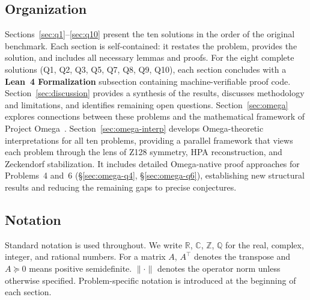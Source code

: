 \documentclass[11pt]{article}
\theoremstyle{definition}
\theoremstyle{remark}
\begin{document}
\subsection{Organization}

Sections~\ref{sec:q1}--\ref{sec:q10} present the ten solutions in the
order of the original benchmark.  Each section is self-contained:
it restates the problem, provides the solution, and includes all necessary
lemmas and proofs.  For the eight complete solutions
(Q1, Q2, Q3, Q5, Q7, Q8, Q9, Q10), each section concludes with a
\textbf{Lean~4 Formalization} subsection containing machine-verifiable
proof code.
Section~\ref{sec:discussion} provides a synthesis of the results, discusses
methodology and limitations, and identifies remaining open questions.
Section~\ref{sec:omega} explores connections between these problems and
the mathematical framework of Project Omega~\cite{omega-theory,omega-fop}.
Section~\ref{sec:omega-interp} develops Omega-theoretic interpretations
for all ten problems, providing a parallel framework that views each problem
through the lens of Z128 symmetry, HPA reconstruction, and Zeckendorf
stabilization.  It includes detailed Omega-native proof approaches for
Problems~4 and~6 (\S\ref{sec:omega-q4}, \S\ref{sec:omega-q6}),
establishing new structural results and reducing the remaining gaps
to precise conjectures.

\subsection{Notation}

Standard notation is used throughout.
We write $\mathbb R$, $\mathbb C$, $\mathbb Z$, $\mathbb Q$ for the
real, complex, integer, and rational numbers.
For a matrix $A$, $A^\top$ denotes the transpose and $A\succeq 0$
means positive semidefinite.
$\|\cdot\|$ denotes the operator norm unless otherwise specified.
Problem-specific notation is introduced at the beginning of each section.






\end{document}
